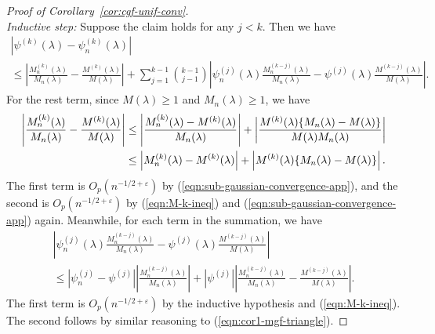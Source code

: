 \documentclass{article}
\theoremstyle{definition}
\newcommand*\eps{\epsilon}
\renewcommand*\epsilon{\varepsilon}
\newcommand{\1}{\mathbbm{1}}
\begin{document}
\begin{proof}[Proof of Corollary~\ref{cor:cgf-unif-conv}]
\[    \]
    \textit{Inductive step:} Suppose the claim holds for any $j < k$. Then we have 
    \begin{multline*}
        |\psi^{(k)}(\lambda) - \psi^{(k)}_n(\lambda)| \\ \leq \left|\frac{M^{(k)}_n(\lambda)}{M_n(\lambda)} - \frac{M^{(k)}(\lambda)}{M(\lambda)}\right| + \sum_{j = 1}^{k-1} {k - 1 \choose j- 1} \left|\psi^{(j)}_n(\lambda)\frac{M^{(k - j)}_n(\lambda)}{M_n(\lambda)} - \psi^{(j)}(\lambda)\frac{M^{(k - j)}(\lambda)}{M(\lambda)}\right|.
    \end{multline*}
    For the rest term, since $M(\lambda) \geq 1$ and $M_n(\lambda) \geq 1$, we have  
    \begin{align}
\left|\frac{M^{(k)}_n(\lambda)}{M_n(\lambda)} - \frac{M^{(k)}(\lambda)}{M(\lambda)}\right| &\leq \left|\frac{M_n^{(k)}(\lambda) - M^{(k)}(\lambda)}{M_n(\lambda)}\right| + \left|\frac{M^{(k)}(\lambda)\{M_n(\lambda) - M(\lambda)\}}{M(\lambda)M_n(\lambda)}\right| \notag \\
&\leq \left|M_n^{(k)}(\lambda) - M^{(k)}(\lambda)\right| + \left|M^{(k)}(\lambda)\{M_n(\lambda) - M(\lambda)\}\right|.
\label{eqn:cor1-mgf-triangle}
    \end{align}
    The first term is $O_p(n^{-1/2 + \eps})$ by (\ref{eqn:sub-gaussian-convergence-app}), and the second is $O_p(n^{-1/2 + \eps})$ by (\ref{eqn:M-k-ineq}) and (\ref{eqn:sub-gaussian-convergence-app}) again. Meanwhile, for each term in the summation, we have 
\begin{multline*}
    \left|\psi^{(j)}_n(\lambda)\frac{M^{(k - j)}_n(\lambda)}{M_n(\lambda)} - \psi^{(j)}(\lambda)\frac{M^{(k - j)}(\lambda)}{M(\lambda)}\right| \\ \leq \left|\psi_n^{(j)} - \psi^{(j)}\right|\left|\frac{M^{(k - j)}_n(\lambda)}{M_n(\lambda)}\right| + |\psi^{(j)}|\left|\frac{M^{(k - j)}_n(\lambda)}{M_n(\lambda)} - \frac{M^{(k - j)}(\lambda)}{M(\lambda)}\right|.
\end{multline*}
The first term is $O_p(n^{-1/2 + \eps})$ by the inductive hypothesis and (\ref{eqn:M-k-ineq}). The second follows by similar reasoning to (\ref{eqn:cor1-mgf-triangle}). 
\end{proof}
\end{document}

